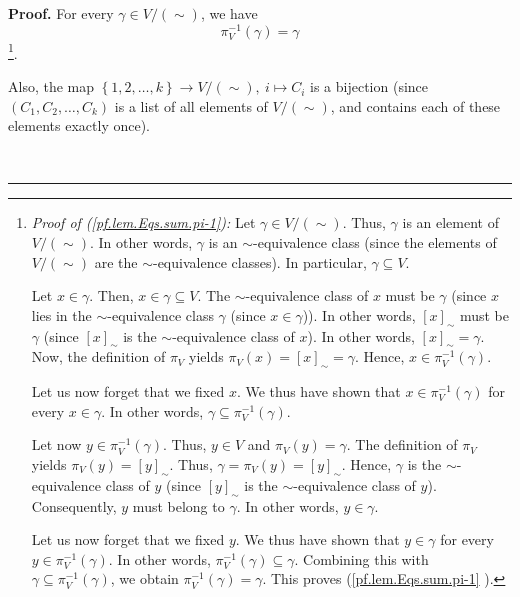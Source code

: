 \documentclass[numbers=enddot,12pt,final,onecolumn,notitlepage]{scrartcl}%
\theoremstyle{definition}
\newenvironment{proof}[1][Proof]{\noindent\textbf{#1.} }{\ \rule{0.5em}{0.5em}}
\newenvironment{verlong}{}{}
\begin{document}
\begin{verlong}
\begin{proof}
For every $\gamma\in V/\left(  \sim\right)  $, we have%
\begin{equation}
\pi_{V}^{-1}\left(  \gamma\right)  =\gamma\label{pf.lem.Eqs.sum.pi-1}%
\end{equation}
\footnote{\textit{Proof of (\ref{pf.lem.Eqs.sum.pi-1}):} Let $\gamma\in
V/\left(  \sim\right)  $. Thus, $\gamma$ is an element of $V/\left(
\sim\right)  $. In other words, $\gamma$ is an $\sim$-equivalence class (since
the elements of $V/\left(  \sim\right)  $ are the $\sim$-equivalence classes).
In particular, $\gamma\subseteq V$.
\par
Let $x\in\gamma$. Then, $x\in\gamma\subseteq V$. The $\sim$-equivalence class
of $x$ must be $\gamma$ (since $x$ lies in the $\sim$-equivalence class
$\gamma$ (since $x\in\gamma$)). In other words, $\left[  x\right]  _{\sim}$
must be $\gamma$ (since $\left[  x\right]  _{\sim}$ is the $\sim$-equivalence
class of $x$). In other words, $\left[  x\right]  _{\sim}=\gamma$. Now, the
definition of $\pi_{V}$ yields $\pi_{V}\left(  x\right)  =\left[  x\right]
_{\sim}=\gamma$. Hence, $x\in\pi_{V}^{-1}\left(  \gamma\right)  $.
\par
Let us now forget that we fixed $x$. We thus have shown that $x\in\pi_{V}%
^{-1}\left(  \gamma\right)  $ for every $x\in\gamma$. In other words,
$\gamma\subseteq\pi_{V}^{-1}\left(  \gamma\right)  $.
\par
Let now $y\in\pi_{V}^{-1}\left(  \gamma\right)  $. Thus, $y\in V$ and $\pi
_{V}\left(  y\right)  =\gamma$. The definition of $\pi_{V}$ yields $\pi
_{V}\left(  y\right)  =\left[  y\right]  _{\sim}$. Thus, $\gamma=\pi
_{V}\left(  y\right)  =\left[  y\right]  _{\sim}$. Hence, $\gamma$ is the
$\sim$-equivalence class of $y$ (since $\left[  y\right]  _{\sim}$ is the
$\sim$-equivalence class of $y$). Consequently, $y$ must belong to $\gamma$.
In other words, $y\in\gamma$.
\par
Let us now forget that we fixed $y$. We thus have shown that $y\in\gamma$ for
every $y\in\pi_{V}^{-1}\left(  \gamma\right)  $. In other words, $\pi_{V}%
^{-1}\left(  \gamma\right)  \subseteq\gamma$. Combining this with
$\gamma\subseteq\pi_{V}^{-1}\left(  \gamma\right)  $, we obtain $\pi_{V}%
^{-1}\left(  \gamma\right)  =\gamma$. This proves (\ref{pf.lem.Eqs.sum.pi-1}%
).}.

Also, the map $\left\{  1,2,\ldots,k\right\}  \rightarrow V/\left(
\sim\right)  ,\ i\mapsto C_{i}$ is a bijection (since $\left(  C_{1}%
,C_{2},\ldots,C_{k}\right)  $ is a list of all elements of $V/\left(
\sim\right)  $, and contains each of these elements exactly once).


\end{proof}
\end{verlong}
\end{document}
